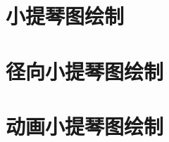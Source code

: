 \documentclass[a4paper,12pt]{article}
\begin{document}
    \section{小提琴图绘制}
    \section{径向小提琴图绘制}
    \section{动画小提琴图绘制}



    \label{applastpage}
    \newpage
    
    
\iffalse
\begin{itemize}[noitemsep,topsep=0pt]
\end{itemize}
\begin{enumerate}[label=\Roman{*}.,noitemsep,topsep=0pt]
\end{enumerate}
\begin{multicols}{2}
\end{multicols}
\fi
\end{document}
